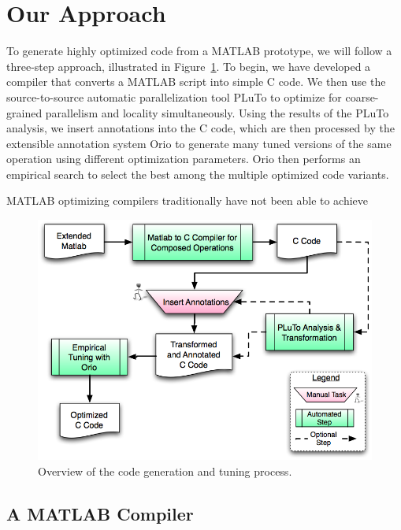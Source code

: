 \documentclass[11pt]{article}
\begin{document}



\section{Our Approach}
\label{sec:approach}

To generate highly optimized code from a MATLAB prototype, we will follow a three-step approach, illustrated in Figure~\ref{fig:process}.  To begin, we have developed a compiler that converts a MATLAB script into simple C code.  We then use the source-to-source automatic parallelization tool  PLuTo\cite{Pluto} to optimize for coarse-grained parallelism and locality simultaneously. Using the results of the PLuTo analysis, we insert annotations into the C code, which are then processed by the extensible annotation system Orio to generate many tuned versions of the same operation using different optimization parameters. Orio then performs an empirical search to select the best among the multiple optimized code variants.

MATLAB optimizing compilers traditionally have not been able to achieve

\begin{figure}[htbp]
\centering
\includegraphics[width=.7\textwidth]{figures/process.png}

\caption{Overview of the code generation and tuning process.}
\label{fig:process}
\end{figure}

\subsection{A MATLAB Compiler}
\label{sec:matlab}
\end{document}
